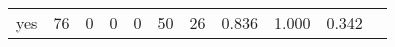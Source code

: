 \begin{longtable}{lp{1.10cm}p{1.10cm}p{1.10cm}p{1.10cm}p{1.10cm}p{1.10cm}p{1.10cm}p{1.10cm}p{1.10cm}p{1.10cm}}
yes       &                     76 &                                  0 &                                 0 &                                0 &                                50 &                              26 &                          0.836 &                                 1.000 &                               0.342 \\
\end{longtable}
